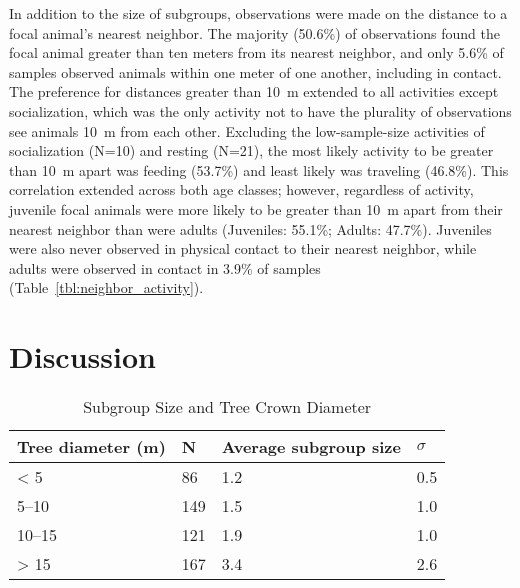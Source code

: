 \documentclass{../../../coursework}
\begin{document}
In addition to the size of subgroups, observations were made on the distance
to a focal animal's nearest neighbor. The majority (50.6\%) of observations
found the focal animal greater than ten meters from its nearest neighbor, and
only 5.6\% of samples observed animals within one meter of one another,
including in contact. The preference for distances greater than
\SI{10}{\metre} extended to all activities except socialization, which was the
only activity not to have the plurality of observations see animals
\SI{10}{\metre} from each other. Excluding the low-sample-size activities of
socialization (N=10) and resting (N=21), the most likely activity to be
greater than \SI{10}{\metre} apart was feeding (53.7\%) and least likely was
traveling (46.8\%). This correlation extended across both age classes; however,
regardless of activity, juvenile focal animals were more likely to be greater
than \SI{10}{\metre} apart from their nearest neighbor than were adults
(Juveniles: 55.1\%; Adults: 47.7\%). Juveniles were also never observed in
physical contact to their nearest neighbor, while adults were observed in
contact in 3.9\% of samples (Table~\ref{tbl:neighbor_activity}).

\section{Discussion}

\begin{table}
    \caption{Subgroup Size and Tree Crown Diameter}
    \label{tbl:subgroup_crown}
    \begin{tabu} to \linewidth{XXXX}
        \toprule
        Tree diameter (\si{\metre}) & N & Average subgroup size & \(\sigma\) \\
        \midrule
        \num{< 5} & 86 & 1.2 & 0.5 \\
        \numrange{5}{10} & 149 & 1.5 & 1.0 \\
        \numrange{10}{15} & 121 & 1.9 & 1.0 \\
        \num{> 15} & 167 & 3.4 & 2.6 \\
        \bottomrule
    \end{tabu}
    \par{}
\end{table}
\end{document}

